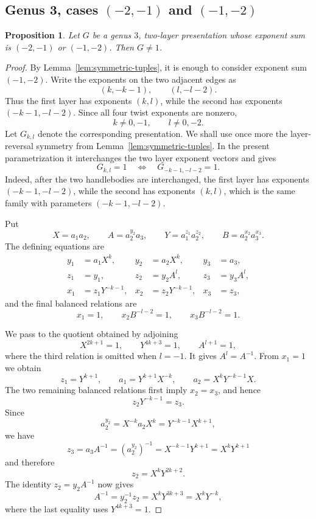 \documentclass{article}
\newtheorem{prop}[theorem]{Proposition}
\begin{document}
\subsection{Genus 3, cases $(-2,-1)$ and $(-1,-2)$}
\begin{prop}\label{prop:minus-two-minus-one}
Let \(G\) be a genus \(3\), two-layer presentation whose exponent sum is
\((-2,-1)\) or \((-1,-2)\). Then \(G\neq 1\).
\end{prop}

\begin{proof}
By Lemma~\ref{lem:symmetric-tuples}, it is enough to consider exponent sum
\((-1,-2)\).  Write the exponents on the two adjacent edges as
\[
 (k,-k-1),\qquad (l,-l-2).
\]
Thus the first layer has exponents \((k,l)\), while the second has
exponents \((-k-1,-l-2)\).  Since all four twist exponents are nonzero,
\[
 k\neq0,-1,\qquad l\neq0,-2.
\]
Let \(G_{k,l}\) denote the corresponding presentation.  We shall use
once more the layer-reversal symmetry from
Lemma~\ref{lem:symmetric-tuples}.  In the present parametrization it
interchanges the two layer exponent vectors and gives
\begin{equation}\label{eq:minus-two-layer-reversal}
 G_{k,l}=1
 \quad\Longleftrightarrow\quad
 G_{-k-1,-l-2}=1.
\end{equation}
Indeed, after the two handlebodies are interchanged, the first layer has
exponents \((-k-1,-l-2)\), while the second has exponents \((k,l)\),
which is the same family with parameters
\((-k-1,-l-2)\).

Put
\[
 X=a_1a_2,\qquad A=a_2^{y_2}a_3,\qquad
 Y=a_1^{z_1}a_2^{z_2},\qquad
 B=a_2^{x_2}a_3^{x_3}.
\]
The defining equations are
\[
\begin{aligned}
y_1&=a_1X^k,& y_2&=a_2X^k,& y_3&=a_3,\\
z_1&=y_1,& z_2&=y_2A^l,& z_3&=y_3A^l,\\
x_1&=z_1Y^{-k-1},& x_2&=z_2Y^{-k-1},& x_3&=z_3,
\end{aligned}
\]
and the final balanced relations are
\[
 x_1=1,\qquad x_2B^{-l-2}=1,\qquad x_3B^{-l-2}=1.
\]

We pass to the quotient obtained by adjoining
\[
 X^{2k+1}=1,\qquad Y^{4k+3}=1,
 \qquad A^{l+1}=1,
\]
where the third relation is omitted when \(l=-1\).  It gives
\(A^l=A^{-1}\).  From \(x_1=1\) we obtain
\[
 z_1=Y^{k+1},\qquad
 a_1=Y^{k+1}X^{-k},\qquad
 a_2=X^kY^{-k-1}X.
\]
The two remaining balanced relations first imply \(x_2=x_3\), and hence
\[
 z_2Y^{-k-1}=z_3.
\]
Since
\[
 a_2^{y_2}=X^{-k}a_2X^k=Y^{-k-1}X^{k+1},
\]
we have
\[
 z_3=a_3A^{-1}=(a_2^{y_2})^{-1}
     =X^{-k-1}Y^{k+1}=X^kY^{k+1}
\]
and therefore
\[
 z_2=X^kY^{2k+2}.
\]
The identity \(z_2=y_2A^{-1}\) now gives
\[
 A^{-1}=y_2^{-1}z_2
       =X^kY^{3k+3}
       =X^kY^{-k},
\]
where the last equality uses \(Y^{4k+3}=1\).


\end{proof}
\end{document}
